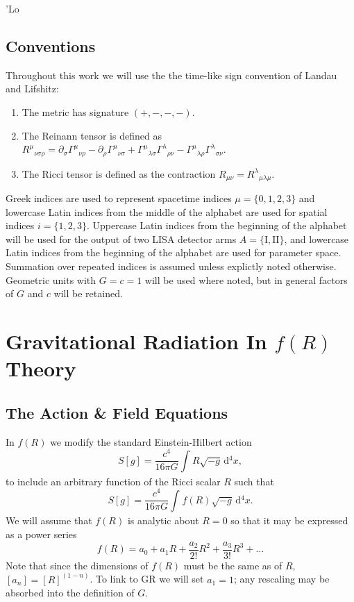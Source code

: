\documentclass[a4paper, 11pt, titlepage, twoside]{report}
\newcommand{\dd}{\ensuremath{\mathrm{d}}}
\newcommand{\intd}[4]{\ensuremath{\int_{#1}^{#2}{#3}\,\dd{#4}}}
\begin{document}
'Lo

\newpage

\section{Conventions}

Throughout this work we will use the the time-like sign convention of Landau and Lifshitz\cite{Landau1975}:
\begin{enumerate}
\item The metric has signature $(+,-,-,-)$.
\item The Reinann tensor is defined as ${R^\mu}_{\nu\sigma\rho} = \partial_\sigma {\Gamma^\mu}_{\nu\rho} - \partial_\rho {\Gamma^\mu}_{\nu\sigma} + {\Gamma^\mu}_{\lambda\sigma}{\Gamma^\lambda}_{\rho\nu} - {\Gamma^\mu}_{\lambda\rho}{\Gamma^\lambda}_{\sigma\nu}$.
\item The Ricci tensor is defined as the contraction $R_{\mu\nu} = {R^\lambda}_{\mu\lambda\mu}$.
\end{enumerate}
Greek indices are used to represent spacetime indices $\mu = \{0,1,2,3\}$ and lowercase Latin indices from the middle of the alphabet are used for spatial indices $i = \{1,2,3\}$. Uppercase Latin indices from the beginning of the alphabet will be used for the output of two LISA detector arms $A = \{\mathrm{I}, \mathrm{II}\}$, and lowercase Latin indices from the beginning of the alphabet are used for parameter space. Summation over repeated indices is assumed unless explictly noted otherwise. Geometric units with $G = c = 1$ will be used where noted, but in general factors of $G$ and $c$ will be retained.

\chapter{Gravitational Radiation In $f(R)$ Theory}

\section{The Action \& Field Equations}

In $f(R)$ we modify the standard Einstein-Hilbert action
\begin{equation}
S[g] = \frac{c^4}{16\pi G}\intd{}{}{R\sqrt{-g}}{^4x},
\end{equation}
to include an arbitrary function of the Ricci scalar $R$ such that
\begin{equation}
S[g] = \frac{c^4}{16\pi G}\intd{}{}{f(R)\sqrt{-g}}{^4x}.
\end{equation}
We will assume that $f(R)$ is analytic about $R = 0$ so that it may be expressed as a power series
\begin{equation}
f(R) = a_0 + a_1 R + \frac{a_2}{2!}R^2 + \frac{a_3}{3!}R^3 + \ldots
\end{equation}
Note that since the dimensions of $f(R)$ must be the same as of $R$, $[a_n] = [R]^{(1-n)}$. To link to GR we will set $a_1 = 1$; any rescaling may be absorbed into the definition of $G$.
\end{document}
